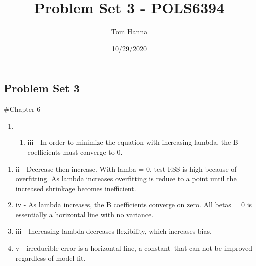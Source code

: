 \documentclass[
]{article}
\title{Problem Set 3 - POLS6394}
\author{Tom Hanna}
\date{10/29/2020}
\newenvironment{Shaded}{\begin{snugshade}}{\end{snugshade}}
\newcommand{\CommentTok}[1]{\textcolor[rgb]{0.56,0.35,0.01}{\textit{#1}}}
\newcommand{\DataTypeTok}[1]{\textcolor[rgb]{0.13,0.29,0.53}{#1}}
\newcommand{\KeywordTok}[1]{\textcolor[rgb]{0.13,0.29,0.53}{\textbf{#1}}}
\newcommand{\NormalTok}[1]{#1}
\newcommand{\StringTok}[1]{\textcolor[rgb]{0.31,0.60,0.02}{#1}}
\providecommand{\tightlist}{%
  \setlength{\itemsep}{0pt}\setlength{\parskip}{0pt}}
\begin{document}
\maketitle

\hypertarget{problem-set-3}{%
\subsection{Problem Set 3}\label{problem-set-3}}

\#Chapter 6

\begin{enumerate}
\def\labelenumi{\arabic{enumi}.}
\setcounter{enumi}{3}
\item
  \begin{enumerate}
  \def\labelenumii{\alph{enumii}.}
  \tightlist
  \item
    iii - In order to minimize the equation with increasing lambda, the
    B coefficients must converge to 0.
  \end{enumerate}
\end{enumerate}

\begin{enumerate}
\def\labelenumi{\alph{enumi}.}
\setcounter{enumi}{1}
\item
  ii - Decrease then increase. With lamba = 0, test RSS is high because
  of overfitting. As lambda increases overfitting is reduce to a point
  until the increased shrinkage becomes inefficient.
\item
  iv - As lambda increases, the B coefficients converge on zero. All
  betas = 0 is essentially a horizontal line with no variance.
\item
  iii - Increasing lambda decreases flexibility, which increases bias.
\item
  v - irreducible error is a horizontal line, a constant, that can not
  be improved regardless of model fit.
\end{enumerate}

\begin{Shaded}
\end{Shaded}
\end{document}
